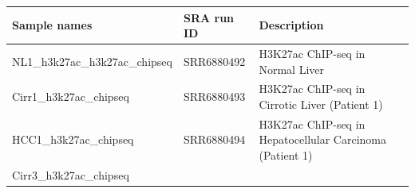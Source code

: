\documentclass[]{article}
\begin{document}
\begin{longtable}[]{@{}lll@{}}
\toprule
\begin{minipage}[b]{0.32\columnwidth}\raggedright\strut
Sample names\strut
\end{minipage} & \begin{minipage}[b]{0.27\columnwidth}\raggedright\strut
SRA run ID\strut
\end{minipage} & \begin{minipage}[b]{0.32\columnwidth}\raggedright\strut
Description\strut
\end{minipage}\tabularnewline
\midrule
\endhead
\begin{minipage}[t]{0.32\columnwidth}\raggedright\strut
NL1\_h3k27ac\_h3k27ac\_chipseq\strut
\end{minipage} & \begin{minipage}[t]{0.27\columnwidth}\raggedright\strut
SRR6880492\strut
\end{minipage} & \begin{minipage}[t]{0.32\columnwidth}\raggedright\strut
H3K27ac ChIP-seq in Normal Liver\strut
\end{minipage}\tabularnewline
\begin{minipage}[t]{0.32\columnwidth}\raggedright\strut
Cirr1\_h3k27ac\_chipseq\strut
\end{minipage} & \begin{minipage}[t]{0.27\columnwidth}\raggedright\strut
SRR6880493\strut
\end{minipage} & \begin{minipage}[t]{0.32\columnwidth}\raggedright\strut
H3K27ac ChIP-seq in Cirrotic Liver (Patient 1)\strut
\end{minipage}\tabularnewline
\begin{minipage}[t]{0.32\columnwidth}\raggedright\strut
HCC1\_h3k27ac\_chipseq\strut
\end{minipage} & \begin{minipage}[t]{0.27\columnwidth}\raggedright\strut
SRR6880494\strut
\end{minipage} & \begin{minipage}[t]{0.32\columnwidth}\raggedright\strut
H3K27ac ChIP-seq in Hepatocellular Carcinoma (Patient 1)\strut
\end{minipage}\tabularnewline
\begin{minipage}[t]{0.32\columnwidth}\raggedright\strut
Cirr3\_h3k27ac\_chipseq\strut
\end{minipage} & \begin{minipage}[t]{0.27\columnwidth}\raggedright\strut

\end{minipage}
\end{longtable}
\end{document}
